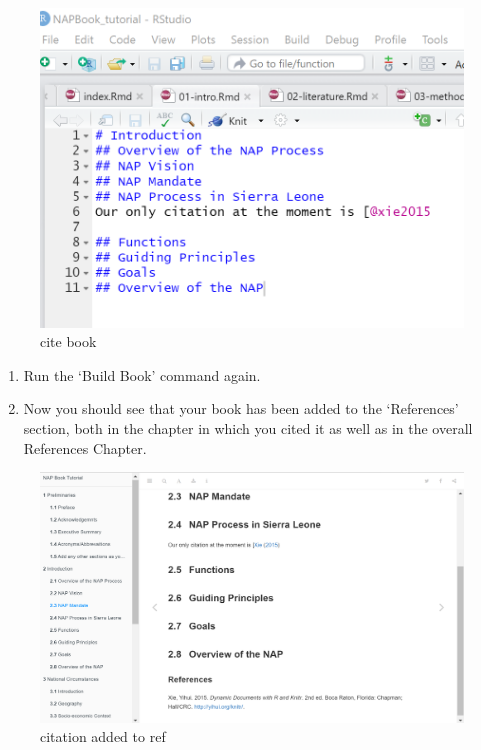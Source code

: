 \documentclass[
]{book}
\providecommand{\tightlist}{%
  \setlength{\itemsep}{0pt}\setlength{\parskip}{0pt}}
\begin{document}
\begin{figure}
\centering
\includegraphics{tutorial_screenshots/cite_book.png}
\caption{cite book}
\end{figure}

\begin{enumerate}
\def\labelenumi{\arabic{enumi}.}
\setcounter{enumi}{31}
\tightlist
\item
  Run the `Build Book' command again.\\
\item
  Now you should see that your book has been added to the `References' section, both in the chapter in which you cited it as well as in the overall References Chapter.
\end{enumerate}

\begin{figure}
\centering
\includegraphics{tutorial_screenshots/reference_incl.png}
\caption{citation added to ref}
\end{figure}
\end{document}
